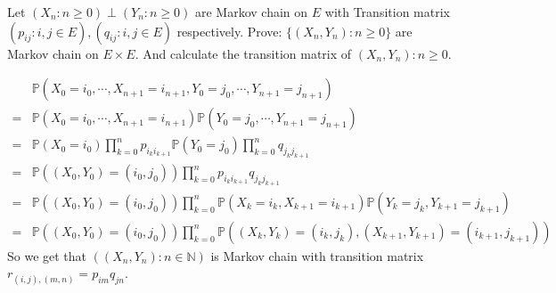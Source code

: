 \documentclass[../main]{subfiles}
\begin{document}
\allowdisplaybreaks[4]
\begin{problem}\label{pro:1}
  Let \((X_n:n \geq 0)\perp (Y_n: n \geq 0)\) are Markov chain on \(E\) with
  Transition matrix \((p_{ij}:i,j \in E),(q_{ij}:i,j \in E)\) respectively.
  Prove: \(\{(X_n,Y_n):n \geq 0\}\) are Markov chain on \(E \times E\).
  And calculate the transition matrix of \((X_n,Y_n):n \geq 0\).
\end{problem}
\begin{solution}
  \[
    \begin{aligned}
       & \mathbb{P}(X_0=i_0,\cdots,X_{n+1} =i_{n+1},Y_0=j_0,\cdots,Y_{n+1}=j_{n+1})
      \\= & \mathbb{P}(X_0=i_0,\cdots,X_{n+1} =i_{n+1})\mathbb{P}(Y_0=j_0,\cdots,Y_{n+1}=j_{n+1})
      \\= & \mathbb{P}(X_0=i_0)\prod_{k=0}^{n} p_{i_k i_{k+1} } \mathbb{P}(Y_0=j_0) \prod_{k=0}^{n} q_{j_k j_{k+1}}
      \\= & \mathbb{P}((X_0,Y_0)=(i_0,j_0)) \prod_{k=0}^{n} p_{i_k i_{k+1} } q_{j_k j_{k+1}}
      \\= & \mathbb{P}((X_0,Y_0)=(i_0,j_0)) \prod_{k=0}^{n} \mathbb{P}(X_k = i_k,X_{k + 1}=i_{k + 1})\mathbb{P}(Y_k=j_k,Y_{k + 1}=j_{k + 1})
      \\=& \mathbb{P}((X_0,Y_0)=(i_0,j_0)) \prod_{k=0}^{n} \mathbb{P}((X_k,Y_{k})=(i_k,j_{k}),(X_{k + 1},Y_{k + 1})=(i_{k + 1},j_{k + 1}))
    \end{aligned}
  \]
  So we get that \(\left((X_n,Y_n): n \in \mathbb{N}\right)\) is Markov chain with transition matrix
  \(r_{(i,j),(m,n)}=p_{im}q_{jn}\).
\end{solution}
\end{document}
